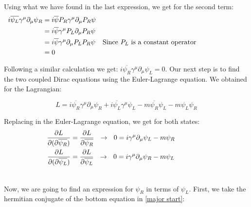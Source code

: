 Using what we have found in the last expression, we get for the second term:
\begin{align}
  &\begin{aligned}
     \mathllap{i\overline{\psi_L}\gamma^\mu \partial_\mu \psi_R}  &=  i \overline{\psi}P_R \gamma^\mu \partial_\mu P_R \psi\\        
     \mathllap{}            &=  i \overline{\psi}\gamma^\mu P_L \partial_\mu P_R\psi \\
     \mathllap{}            &=  i \overline{\psi}\gamma^\mu \partial_\mu P_L P_R \psi && \text{Since $P_L$ is a constant operator}\\
     \mathllap{}            &=  0
  &\end{aligned}
\end{align}

Following a similar calculation we get: $i\overline{\psi_R}\gamma^\mu \partial_\mu \psi_L = 0$. Our next step is to find the two coupled Dirac equations using the Euler-Lagrange equation. We 
obtained for the Lagrangian:   

\begin{equation}
L = i \overline{\psi_R} \gamma^\mu \partial_\mu \psi_R + i \overline{\psi_L}\gamma^\mu \psi_L -m\overline{\psi_R}\psi_L - m \psi_L\psi_R
\end{equation}

Replacing in the Euler-Lagrange equation, we get for both states:
\begin{align}
  &\begin{aligned}\label{major start}
     \mathllap{\frac{\partial L}{\partial(\partial \overline{\psi_R})}}  &=  \frac{\partial L}{\partial \overline{\psi_R}} \ \ \rightarrow \ \ 0 = i \gamma^\mu \partial_\mu \psi_L -m \psi_R  \\        
     \mathllap{\frac{\partial L}{\partial(\partial \overline{\psi_L})}}  &=  \frac{\partial L}{\partial \overline{\psi_L}} \ \ \rightarrow \ \ 0 = i \gamma^\mu \partial_\mu \psi_R -m \psi_L\\ 
  &\end{aligned} 
\end{align}

Now, we are going to find an expression for $\psi_R$ in terms of $\psi_L$. First, we take the hermitian conjugate of the bottom equation in \ref{major start}:

